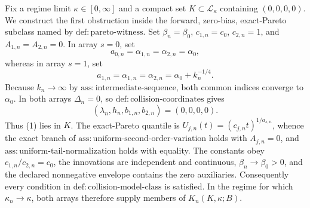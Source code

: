 Fix a regime limit \(\kappa\in[0,\infty]\) and a compact set \(K\subset\mathcal L_\kappa\) containing \((0,0,0,0)\).  We construct the first obstruction inside the forward, zero-bias, exact-Pareto subclass named by \(\mathrm{def{:}pareto\text{-}witness}\).  Set \(\beta_n=\beta_0\), \(c_{1,n}=c_0\), \(c_{2,n}=1\), and \(A_{1,n}=A_{2,n}=0\).  In array \(s=0\), set
\[
 a_{0,n}=\alpha_{1,n}=\alpha_{2,n}=\alpha_0,
\]
whereas in array \(s=1\), set
\[
 a_{1,n}=\alpha_{1,n}=\alpha_{2,n}=\alpha_0+k_n^{-1/4}.
\]
Because \(k_n\to\infty\) by \(\mathrm{ass{:}intermediate\text{-}sequence}\), both common indices converge to \(\alpha_0\).  In both arrays \(\Delta_n=0\), so \(\mathrm{def{:}collision\text{-}coordinates}\) gives
\[
 (\lambda_n,h_n,b_{1,n},b_{2,n})=(0,0,0,0). \tag{1}
\]
Thus (1) lies in \(K\).  The exact-Pareto quantile is \(U_{j,n}(t)=(c_{j,n}t)^{1/a_{s,n}}\), whence the exact branch of \(\mathrm{ass{:}uniform\text{-}second\text{-}order\text{-}variation}\) holds with \(A_{j,n}=0\), and \(\mathrm{ass{:}uniform\text{-}tail\text{-}normalization}\) holds with equality.  The constants obey \(c_{1,n}/c_{2,n}=c_0\), the innovations are independent and continuous, \(\beta_n\to\beta_0>0\), and the declared nonnegative envelope contains the zero auxiliaries.  Consequently every condition in \(\mathrm{def{:}collision\text{-}model\text{-}class}\) is satisfied.  In the regime for which \(\kappa_n\to\kappa\), both arrays therefore supply members of \(K_n(K,\kappa;B)\).

